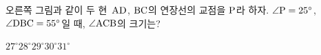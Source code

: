 \noindent\begin{minipage}[t]{0.58\linewidth}\vspace{0pt}\raggedright 오른쪽 그림과 같이 두 현~$\mathrm{AD}$, $\mathrm{BC}$의 연장선의 교점을 $\mathrm{P}$라 하자. $\angle\mathrm{P}=25^\circ$, $\angle\mathrm{DBC}=55^\circ$일 때, $\angle\mathrm{ACB}$의 크기는?\end{minipage}\hfill\begin{minipage}[t]{0.4\linewidth}\vspace{0pt}\centering \resizebox{\ifdim\width>\linewidth\linewidth\else\width\fi}{!}{}\end{minipage}\par
\begin{choices32}{$27^\circ$}{$28^\circ$}{$29^\circ$}{$30^\circ$}{$31^\circ$}\end{choices32}
